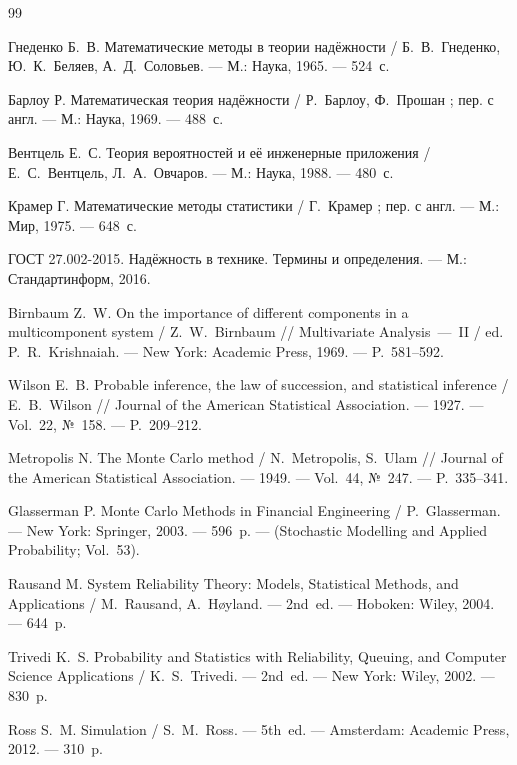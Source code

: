 \documentclass[12pt]{article}
\begin{document}
\begin{thebibliography}{99}

Гнеденко Б.~В. Математические методы в теории надёжности /
Б.~В.~Гнеденко, Ю.~К.~Беляев, А.~Д.~Соловьев. ---
М.: Наука, 1965. --- 524~с.

Барлоу Р. Математическая теория надёжности /
Р.~Барлоу, Ф.~Прошан ; пер. с англ. ---
М.: Наука, 1969. --- 488~с.

Вентцель Е.~С. Теория вероятностей и её инженерные приложения /
Е.~С.~Вентцель, Л.~А.~Овчаров. ---
М.: Наука, 1988. --- 480~с.

Крамер Г. Математические методы статистики /
Г.~Крамер ; пер. с англ. ---
М.: Мир, 1975. --- 648~с.

ГОСТ 27.002-2015. Надёжность в технике. Термины и определения. ---
М.: Стандартинформ, 2016.

Birnbaum Z.~W. On the importance of different components in a
multicomponent system / Z.~W.~Birnbaum //
Multivariate Analysis~---~II / ed. P.~R.~Krishnaiah. ---
New York: Academic Press, 1969. --- P.~581--592.

Wilson E.~B. Probable inference, the law of succession, and statistical
inference / E.~B.~Wilson // Journal of the American Statistical
Association. --- 1927. --- Vol.~22, №~158. --- P.~209--212.

Metropolis N. The Monte Carlo method / N.~Metropolis, S.~Ulam //
Journal of the American Statistical Association. --- 1949. ---
Vol.~44, №~247. --- P.~335--341.

Glasserman P. Monte Carlo Methods in Financial Engineering /
P.~Glasserman. --- New York: Springer, 2003. --- 596~p. ---
(Stochastic Modelling and Applied Probability; Vol.~53).

Rausand M. System Reliability Theory: Models, Statistical Methods, and
Applications / M.~Rausand, A.~H{\o}yland. --- 2nd~ed. ---
Hoboken: Wiley, 2004. --- 644~p.

Trivedi K.~S. Probability and Statistics with Reliability, Queuing, and
Computer Science Applications / K.~S.~Trivedi. --- 2nd~ed. ---
New York: Wiley, 2002. --- 830~p.

Ross S.~M. Simulation / S.~M.~Ross. --- 5th~ed. ---
Amsterdam: Academic Press, 2012. --- 310~p.

\end{thebibliography}
\end{document}
